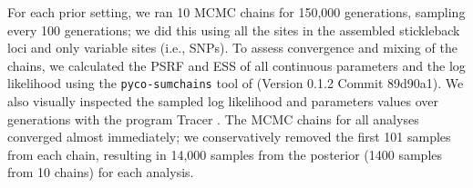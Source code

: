 For each prior setting, we ran 10 MCMC chains for 150,000 generations, sampling
every 100 generations; we did this using all the sites in the assembled
stickleback loci and only variable sites (i.e., SNPs).
To assess convergence and mixing of the chains, we calculated the PSRF
\citep{Brooks1998}
and ESS \citep{Gong2014} of all continuous parameters and the log likelihood
using the \texttt{pyco-sumchains} tool of \pycoevolity (Version 0.1.2 Commit
89d90a1).
We also visually inspected the sampled log likelihood and parameters values
over generations with the program Tracer \citep[Version 1.6;][]{Tracer16}.
The MCMC chains for all analyses converged almost immediately; we
conservatively removed the first 101 samples from each chain, resulting in
14,000 samples from the posterior (1400 samples from 10 chains) for each
analysis.
